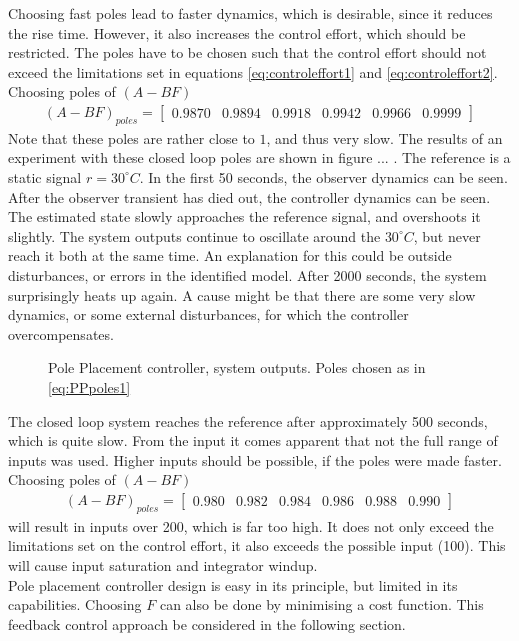 Choosing fast poles lead to faster dynamics, which is desirable, since it reduces the rise time. However, it also increases the control effort, which should be restricted. The poles have to be chosen such that the control effort should not exceed the limitations set in equations \ref{eq:controleffort1} and \ref{eq:controleffort2}. Choosing poles of $(A-BF)$
\begin{align}
    (A-BF)_{poles} = \begin{bmatrix} 0.9870 & 0.9894 & 0.9918 & 0.9942 & 0.9966 & 0.9999 \end{bmatrix} \label{eq:PPpoles1}
\end{align}
Note that these poles are rather close to $1$, and thus very slow. The results of an experiment with these closed loop poles are shown in figure ... . The reference is a static signal $r = 30^{\circ}C$. In the first 50 seconds, the observer dynamics can be seen. After the observer transient has died out, the controller dynamics can be seen. The estimated state slowly approaches the reference signal, and overshoots it slightly. The system outputs continue to oscillate around the $30^{\circ}C$, but never reach it both at the same time. An explanation for this could be outside disturbances, or errors in the identified model. After 2000 seconds, the system surprisingly heats up again. A cause might be that there are some very slow dynamics, or some external disturbances, for which the controller overcompensates.
\begin{figure}
    \centering
    
    \caption{Pole Placement controller, system outputs. Poles chosen as in \ref{eq:PPpoles1}}
    \label{fig:PPexp1}
\end{figure}
The closed loop system reaches the reference after approximately 500 seconds, which is quite slow. From the input it comes apparent that not the full range of inputs was used. Higher inputs should be possible, if the poles were made faster. Choosing poles of $(A-BF)$
\begin{align}
    (A-BF)_{poles} = \begin{bmatrix} 0.980 & 0.982 & 0.984 & 0.986 & 0.988 & 0.990 \end{bmatrix} \nonumber
\end{align}
will result in inputs over 200, which is far too high. It does not only exceed the limitations set on the control effort, it also exceeds the possible input (100). This will cause input saturation and integrator windup.\\
Pole placement controller design is easy in its principle, but limited in its capabilities. Choosing $F$ can also be done by minimising a cost function. This feedback control approach be considered in the following section.

